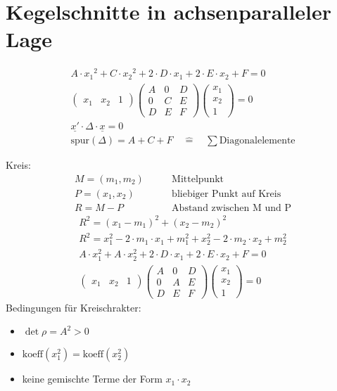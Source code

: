\section{Kegelschnitte in achsenparalleler Lage}
\begin{gather}
  A\cdot {x_1}^2+C\cdot{x_2}^2+2\cdot D\cdot x_1 + 2\cdot E\cdot x_2 + F = 0 \\
  \begin{pmatrix} x_1 & x_2 & 1 \end{pmatrix}
	\begin{pmatrix}
		A & 0 & D \\
		0 & C & E \\
		D & E & F
	\end{pmatrix}
	\begin{pmatrix}
		x_1 \\
		x_2 \\
		1
	\end{pmatrix} = 0 \\
  \underline{x'} \cdot \Delta \cdot \underline{x} = 0 \\
  \text{spur}(\Delta) = A + C + F \quad\hat{=}\quad \sum\text{Diagonalelemente}
\end{gather}

Kreis:
\begin{align*}
  M = (m_1, m_2) \qquad & \text{Mittelpunkt} \\
  P = (x_1, x_2) \qquad & \text{bliebiger Punkt auf Kreis} \\
  R = M - P \qquad & \text{Abstand zwischen M und P}
\end{align*}
\begin{gather}
  R^2 = {\left({x_1 - m_1}\right)}^2 + {\left({x_2 - m_2}\right)}^2 \\
  R^2 = x_1^2 - 2\cdot m_1\cdot x_1 + m_1^2 + x_2^2 - 2\cdot m_2\cdot x_2 + m_2^2 \\
  A\cdot x_1^2 + A\cdot x_2^2 + 2\cdot D\cdot x_1 + 2\cdot E\cdot x_2 + F = 0 \\
  \begin{pmatrix} x_1 & x_2 & 1 \end{pmatrix}
	\begin{pmatrix}
		A & 0 & D \\
		0 & A & E \\
		D & E & F
	\end{pmatrix}
	\begin{pmatrix} x_1 \\ x_2 \\ 1 \end{pmatrix} = 0
\end{gather}
Bedingungen f\"ur Kreischrakter:
\begin{itemize}
  \item $\det{\rho} = A^2 > 0$
  \item $\text{koeff}(x_1^2) = \text{koeff}(x_2^2)$
  \item keine gemischte Terme der Form $x_1\cdot x_2$
\end{itemize}


